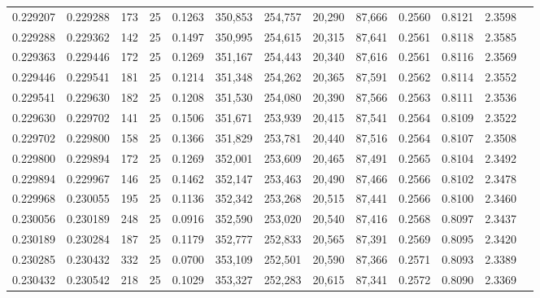 \begin{tabular}{rrrrrrrrrrrrr}
0.229207 & 0.229288 &   173 &  25 &                                     0.1263 & 350,853 & 254,757 &  20,290 &  87,666 & 0.2560 & 0.8121 & 2.3598 \\
0.229288 & 0.229362 &   142 &  25 &                                     0.1497 & 350,995 & 254,615 &  20,315 &  87,641 & 0.2561 & 0.8118 & 2.3585 \\
0.229363 & 0.229446 &   172 &  25 &                                     0.1269 & 351,167 & 254,443 &  20,340 &  87,616 & 0.2561 & 0.8116 & 2.3569 \\
0.229446 & 0.229541 &   181 &  25 &                                     0.1214 & 351,348 & 254,262 &  20,365 &  87,591 & 0.2562 & 0.8114 & 2.3552 \\
0.229541 & 0.229630 &   182 &  25 &                                     0.1208 & 351,530 & 254,080 &  20,390 &  87,566 & 0.2563 & 0.8111 & 2.3536 \\
0.229630 & 0.229702 &   141 &  25 &                                     0.1506 & 351,671 & 253,939 &  20,415 &  87,541 & 0.2564 & 0.8109 & 2.3522 \\
0.229702 & 0.229800 &   158 &  25 &                                     0.1366 & 351,829 & 253,781 &  20,440 &  87,516 & 0.2564 & 0.8107 & 2.3508 \\
0.229800 & 0.229894 &   172 &  25 &                                     0.1269 & 352,001 & 253,609 &  20,465 &  87,491 & 0.2565 & 0.8104 & 2.3492 \\
0.229894 & 0.229967 &   146 &  25 &                                     0.1462 & 352,147 & 253,463 &  20,490 &  87,466 & 0.2566 & 0.8102 & 2.3478 \\
0.229968 & 0.230055 &   195 &  25 &                                     0.1136 & 352,342 & 253,268 &  20,515 &  87,441 & 0.2566 & 0.8100 & 2.3460 \\
0.230056 & 0.230189 &   248 &  25 &                                     0.0916 & 352,590 & 253,020 &  20,540 &  87,416 & 0.2568 & 0.8097 & 2.3437 \\
0.230189 & 0.230284 &   187 &  25 &                                     0.1179 & 352,777 & 252,833 &  20,565 &  87,391 & 0.2569 & 0.8095 & 2.3420 \\
0.230285 & 0.230432 &   332 &  25 &                                     0.0700 & 353,109 & 252,501 &  20,590 &  87,366 & 0.2571 & 0.8093 & 2.3389 \\
0.230432 & 0.230542 &   218 &  25 &                                     0.1029 & 353,327 & 252,283 &  20,615 &  87,341 & 0.2572 & 0.8090 & 2.3369 \\

\end{tabular}
